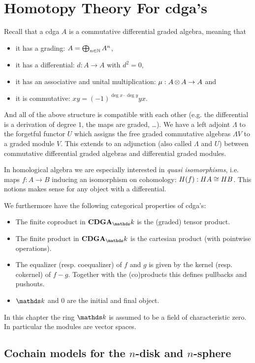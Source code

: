 
\chapter{Homotopy Theory For cdga's}

Recall that a cdga $A$ is a commutative differential graded algebra, meaning that
\begin{itemize}
	\item it has a grading: $A = \bigoplus_{n\in\mathbb{N}} A^n$,
	\item it has a differential: $d: A \to A$ with $d^2 = 0$,
	\item it has an associative and unital multiplication: $\mu: A \operatorname*{\otimes} A \to A$ and
	\item it is commutative: $x y = (-1)^{\deg{x}\cdot\deg{y}} y x$.
\end{itemize}
And all of the above structure is compatible with each other (e.g. the differential is a derivation of degree $1$, the maps are graded, \dots). We have a left adjoint $\Lambda$ to the forgetful functor $U$ which assigns the free graded commutative algebras $\Lambda V$ to a graded module $V$. This extends to an adjunction (also called $\Lambda$ and $U$) between commutative differential graded algebras and differential graded modules.

In homological algebra we are especially interested in \emph{quasi isomorphisms}, i.e. maps $f: A \to B$ inducing an isomorphism on cohomology: $H(f): HA \cong HB$. This notions makes sense for any object with a differential.

We furthermore have the following categorical properties of cdga's:
\begin{itemize}
	\item The finite coproduct in $\CDGA_\k$ is the (graded) tensor product.
	\item The finite product in $\CDGA_\k$ is the cartesian product (with pointwise operations).
	\item The equalizer (resp. coequalizer) of $f$ and $g$ is given by the kernel (resp. cokernel) of $f - g$. Together with the (co)products this defines pullbacks and pushouts.
	\item $\k$ and $0$ are the initial and final object.
\end{itemize}

In this chapter the ring $\k$ is assumed to be a field of characteristic zero. In particular the modules are vector spaces.

\section{Cochain models for the $n$-disk and $n$-sphere}


